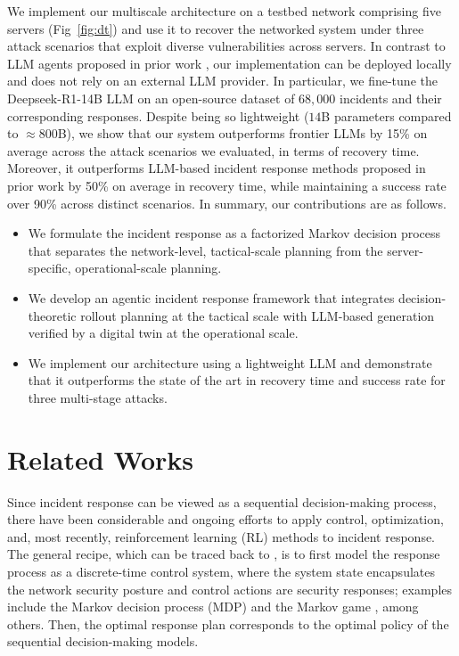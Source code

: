 \documentclass[runningheads,10pt]{llncs}
\begin{document}
We implement our multiscale architecture on a testbed network comprising five servers (Fig~\ref{fig:dt}) and use it to recover the networked system under three attack scenarios that exploit diverse vulnerabilities across servers. In contrast to LLM agents proposed in prior work \cite{hamoun25llm-acd,cardenas25llm4acd,guo25ircopilot}, our implementation can be deployed locally and does not rely on an external LLM provider. In particular, we fine-tune the Deepseek-R1-14B LLM \cite{deepseek-r1} on an open-source dataset of $68,000$ incidents and their corresponding responses. Despite being so lightweight ($14$B parameters compared to $\approx 800$B), we show that our system outperforms frontier LLMs by 15\% on average across the attack scenarios we evaluated, in terms of recovery time. Moreover, it outperforms LLM-based incident response methods proposed in prior work by {50\%} on average in recovery time, while maintaining a success rate over 90\% across distinct scenarios. In summary, our contributions are as follows. 
\begin{itemize}
    \item We formulate the incident response as a factorized Markov decision process that separates the network-level, tactical-scale planning from the server-specific, operational-scale planning.
    \item We develop an agentic incident response framework that integrates decision-theoretic rollout planning at the tactical scale with LLM-based generation verified by a digital twin at the operational scale.
    \item We implement our architecture using a lightweight LLM and demonstrate that it outperforms the state of the art in recovery time and success rate for three multi-stage attacks.
\end{itemize}

\section{Related Works}
Since incident response can be viewed as a sequential decision-making process, there have been considerable and ongoing efforts to apply control, optimization, and, most recently, reinforcement learning (RL) methods to incident response. The general recipe, which can be traced back to \cite{kreidl04feedback-defense}, is to first model the response process as a discrete-time control system, where the system state encapsulates the network security posture and control actions are security responses; examples include the Markov decision process (MDP) \cite{burnap25acd-survey} and the Markov game \cite{alpcan10book,tao24ddztd}, among others. Then, the optimal response plan corresponds to the optimal policy of the sequential decision-making models. 
\end{document}

